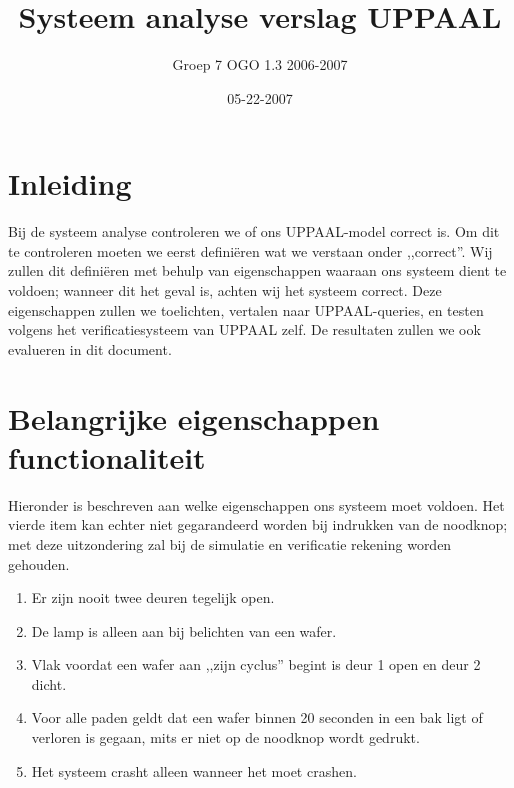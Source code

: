 \documentclass[]{report}
\title{Systeem analyse verslag UPPAAL}
\author{Groep 7 OGO 1.3 2006-2007}
\date{05-22-2007}
\begin{document}
  
  \tableofcontents

    \chapter{Inleiding}
        Bij de systeem analyse controleren we of ons UPPAAL-model correct is. Om dit te controleren moeten
        we eerst defini\"eren wat we verstaan onder ,,correct''. Wij zullen dit defini\"eren met
        behulp van eigenschappen waaraan ons systeem dient te voldoen; wanneer dit het geval is, achten
        wij het systeem correct. Deze eigenschappen zullen we toelichten, vertalen naar UPPAAL-queries, en
        testen volgens het verificatiesysteem van UPPAAL zelf. De resultaten zullen we ook evalueren in dit
        document.


    \chapter{Belangrijke eigenschappen functionaliteit}
        Hieronder is beschreven aan welke eigenschappen ons systeem moet voldoen. Het vierde item kan echter niet
        gegarandeerd worden bij indrukken van de noodknop; met deze uitzondering zal bij de simulatie en verificatie
        rekening worden gehouden.
        \begin{enumerate}
            \item Er zijn nooit twee deuren tegelijk open.
            \item De lamp is alleen aan bij belichten van een wafer.
            \item Vlak voordat een wafer aan ,,zijn cyclus'' begint is deur 1 open en deur 2 dicht.
            \item Voor alle paden geldt dat een wafer binnen 20 seconden in een bak ligt of verloren is gegaan, mits er niet
                  op de noodknop wordt gedrukt.
            \item Het systeem crasht alleen wanneer het moet crashen.
        \end{enumerate}
\end{document}
